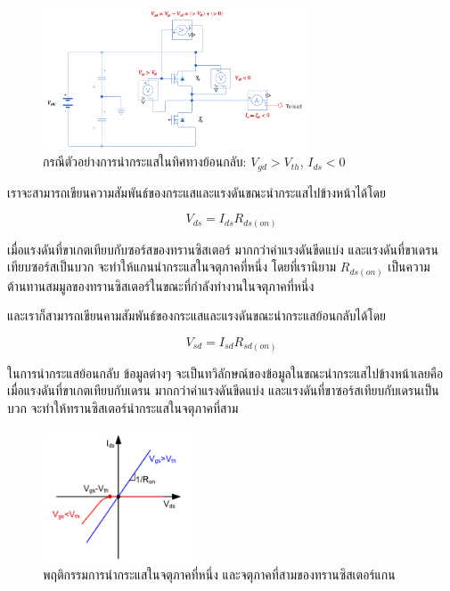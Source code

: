 \documentclass[11pt,a4paper]{article}
\begin{document}
\begin{figure}[h!]
    \begin{center}
        \includegraphics[width=0.7\textwidth]{inverter_q3.png}
    \end{center}
    \caption{กรณีตัวอย่างการนำกระแสในทิศทางย้อนกลับ: $V_{gd} > V_{th}$, $I_{ds} < 0$}
    \label{inverter_q1}
\end{figure}

เราจะสามารถเขียนความสัมพันธ์ของกระแสและแรงดันขณะนำกระแสไปข้างหน้าได้โดย

\begin{equation}
    V_{ds} = I_{ds}R_{ds(on)}
\end{equation}

เมื่อแรงดันที่ขาเกตเทียบกับซอร์สของทรานซิสเตอร์ มากกว่าค่าแรงดันขีดแบ่ง และแรงดันที่ขาเดรนเทียบซอร์สเป็นบวก จะทำให้แกนนำกระแสในจตุภาคที่หนึ่ง โดยที่เรานิยาม $R_{ds(on)}$ เป็นความต้านทานสมมูลของทรานซิสเตอร์ในขณะที่กำลังทำงานในจตุภาคที่หนึ่ง

และเราก็สามารถเขียนคามสัมพันธ์ของกระแสและแรงดันขณะนำกระแสย้อนกลับได้โดย

\begin{equation}
    V_{sd} = I_{sd}R_{sd(on)}
\end{equation}

ในการนำกระแสย้อนกลับ ข้อมูลต่างๆ จะเป็นทวิลักษณ์ของข้อมูลในขณะนำกระแสไปข้างหน้าเลยคือ เมื่อแรงดันที่ขาเกตเทียบกับเดรน มากกว่าค่าแรงดันขีดแบ่ง และแรงดันที่ขาซอร์สเทียบกับเดรนเป็นบวก จะทำให้ทรานซิสเตอร์นำกระแสในจตุภาคที่สาม

\begin{figure}[h]
    \begin{center}
        \includegraphics[width=0.4\textwidth]{gan_behavior.png}
    \end{center}
    \caption{พฤติกรรมการนำกระแสในจตุภาคที่หนึ่ง และจตุภาคที่สามของทรานซิสเตอร์แกน}
    \label{gan_behavior}
\end{figure}
\end{document}
